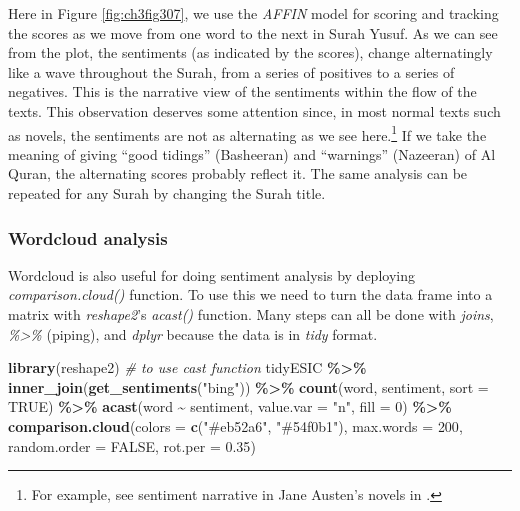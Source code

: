 \documentclass[
]{article}
\newenvironment{Shaded}{\begin{snugshade}}{\end{snugshade}}
\newcommand{\AttributeTok}[1]{\textcolor[rgb]{0.13,0.29,0.53}{#1}}
\newcommand{\CommentTok}[1]{\textcolor[rgb]{0.56,0.35,0.01}{\textit{#1}}}
\newcommand{\ConstantTok}[1]{\textcolor[rgb]{0.56,0.35,0.01}{#1}}
\newcommand{\DecValTok}[1]{\textcolor[rgb]{0.00,0.00,0.81}{#1}}
\newcommand{\FloatTok}[1]{\textcolor[rgb]{0.00,0.00,0.81}{#1}}
\newcommand{\FunctionTok}[1]{\textcolor[rgb]{0.13,0.29,0.53}{\textbf{#1}}}
\newcommand{\NormalTok}[1]{#1}
\newcommand{\SpecialCharTok}[1]{\textcolor[rgb]{0.81,0.36,0.00}{\textbf{#1}}}
\newcommand{\StringTok}[1]{\textcolor[rgb]{0.31,0.60,0.02}{#1}}
\begin{document}
Here in Figure \ref{fig:ch3fig307}, we use the \emph{AFFIN} model for scoring and tracking the scores as we move from one word to the next in Surah Yusuf. As we can see from the plot, the sentiments (as indicated by the scores), change alternatingly like a wave throughout the Surah, from a series of positives to a series of negatives. This is the narrative view of the sentiments within the flow of the texts. This observation deserves some attention since, in most normal texts such as novels, the sentiments are not as alternating as we see here.\footnote{For example, see sentiment narrative in Jane Austen's novels in \citet{silge2017}.} If we take the meaning of giving ``good tidings'' (Basheeran) and ``warnings'' (Nazeeran) of Al Quran, the alternating scores probably reflect it. The same analysis can be repeated for any Surah by changing the Surah title.

\hypertarget{wordcloud-analysis-1}{%
\subsubsection{Wordcloud analysis}\label{wordcloud-analysis-1}}

Wordcloud is also useful for doing sentiment analysis by deploying \emph{comparison.cloud()} function. To use this we need to turn the data frame into a matrix with \emph{reshape2}'s \emph{acast()} function. Many steps can all be done with \emph{joins}, \emph{\%\textgreater\%} (piping), and \emph{dplyr} because the data is in \emph{tidy} format.

\begin{Shaded}
\begin{Highlighting}[]
\FunctionTok{library}\NormalTok{(reshape2) }\CommentTok{\# to use cast function}
\NormalTok{tidyESIC }\SpecialCharTok{\%\textgreater{}\%}
  \FunctionTok{inner\_join}\NormalTok{(}\FunctionTok{get\_sentiments}\NormalTok{(}\StringTok{"bing"}\NormalTok{)) }\SpecialCharTok{\%\textgreater{}\%}
  \FunctionTok{count}\NormalTok{(word, sentiment, }\AttributeTok{sort =} \ConstantTok{TRUE}\NormalTok{) }\SpecialCharTok{\%\textgreater{}\%}
  \FunctionTok{acast}\NormalTok{(word }\SpecialCharTok{\textasciitilde{}}\NormalTok{ sentiment, }\AttributeTok{value.var =} \StringTok{"n"}\NormalTok{, }\AttributeTok{fill =} \DecValTok{0}\NormalTok{) }\SpecialCharTok{\%\textgreater{}\%}
  \FunctionTok{comparison.cloud}\NormalTok{(}\AttributeTok{colors =} \FunctionTok{c}\NormalTok{(}\StringTok{"\#eb52a6"}\NormalTok{, }\StringTok{"\#54f0b1"}\NormalTok{),}
                   \AttributeTok{max.words =} \DecValTok{200}\NormalTok{,}
                   \AttributeTok{random.order =} \ConstantTok{FALSE}\NormalTok{,}
                   \AttributeTok{rot.per =} \FloatTok{0.35}\NormalTok{)}
\end{Highlighting}
\end{Shaded}
\end{document}
